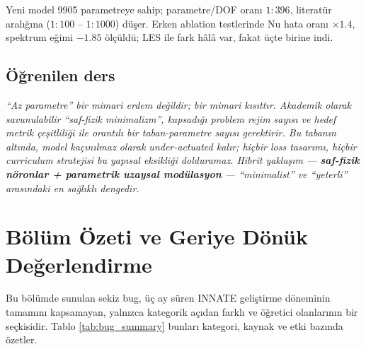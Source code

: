 Yeni model 9905 parametreye sahip; parametre/DOF oranı $1{:}396$, literatür aralığına ($1{:}100$ -- $1{:}1000$) düşer. Erken ablation testlerinde Nu hata oranı $\times 1.4$, spektrum eğimi $-1.85$ ölçüldü; LES ile fark hâlâ var, fakat üçte birine indi.

\subsection*{Öğrenilen ders}

\begin{remark}
\textit{``Az parametre'' bir mimari erdem değildir; bir mimari kısıttır. Akademik olarak savunulabilir ``saf-fizik minimalizm'', kapsadığı problem rejim sayısı ve hedef metrik çeşitliliği ile orantılı bir taban-parametre sayısı gerektirir. Bu tabanın altında, model kaçınılmaz olarak under-actuated kalır; hiçbir loss tasarımı, hiçbir curriculum stratejisi bu yapısal eksikliği dolduramaz. Hibrit yaklaşım --- \textbf{saf-fizik nöronlar + parametrik uzaysal modülasyon} --- ``minimalist'' ve ``yeterli'' arasındaki en sağlıklı dengedir.}
\end{remark}


\section{Bölüm Özeti ve Geriye Dönük Değerlendirme}
\label{sec:bug_ozet}

Bu bölümde sunulan sekiz bug, üç ay süren INNATE geliştirme döneminin tamamını kapsamayan, yalnızca kategorik açıdan farklı ve öğretici olanlarının bir seçkisidir. Tablo \ref{tab:bug_summary} bunları kategori, kaynak ve etki bazında özetler.

